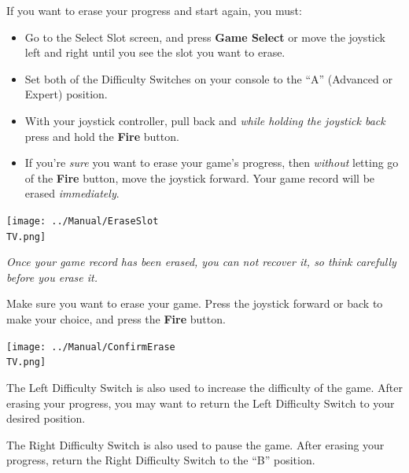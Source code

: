 \documentclass[10pt,twocolumn,openany,article]{memoir}
\newcommand\TV{NTSC}
\newcommand\TV{PAL}
\newcommand\TV{SECAM}
\begin{document}
\else

If you want to erase your progress and start again, you must:

\begin{itemize}
\item Go  to the Select Slot  screen, and press \textbf{Game  Select} or
  move  the joystick  left and  right until  you see  the slot  you want
  to erase.
\item Set both  of the Difficulty Switches on your  console to the ``A''
  (Advanced or Expert) position.
\item With your  joystick controller, pull back  and \emph{while holding
    the joystick back} press and hold the \textbf{Fire} button.
\item If you're \emph{sure} you want to erase your game's progress, then
  \emph{without}  letting  go  of  the \textbf{Fire}  button,  move  the
  joystick  forward. \ifdefined\DEMO  Your  game record  will be  erased
  \emph{immediately}. \fi
\end{itemize}

\begin{center}
  \texttt{[image: ../Manual/EraseSlot\\TV.png]}
\end{center}

\ifdefined\DEMO

\emph{Once your game record has been  erased, you can not recover it, so
  think carefully before you erase it.}

\else

Make sure  you want to  erase your game.  Press the joystick  forward or
back to make your choice, and press the \textbf{Fire} button.

\begin{center}
  \texttt{[image: ../Manual/ConfirmErase\\TV.png]}
\end{center}

\fi

The Left  Difficulty Switch is also  used to increase the  difficulty of
the game. After  erasing your progress, you may want  to return the Left
Difficulty Switch to your desired position.


\ifdefined\TVSECAM

The  Right   Difficulty  Switch  is   also  used  to  pause   the  game.
After erasing your  progress, return the Right Difficulty  Switch to the
``B'' position.

\fi
\end{document}
